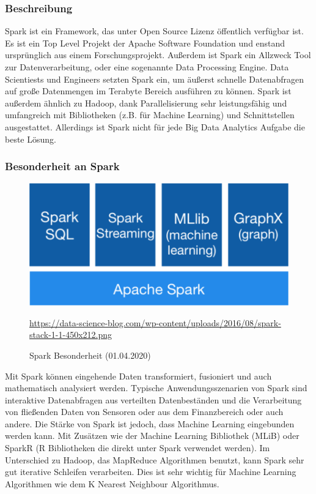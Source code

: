\subsubsection{Beschreibung}
Spark ist ein Framework, das unter Open Source Lizenz öffentlich verfügbar ist. Es ist ein Top Level Projekt der Apache Software Foundation und enstand ursprünglich aus einem Forschungsprojekt.
Außerdem ist Spark ein Allzweck Tool zur Datenverarbeitung, oder eine sogenannte Data Processing Engine. Data Scientiests und Engineers setzten Spark ein, um äußerst schnelle Datenabfragen auf große Datenmengen im Terabyte Bereich ausführen zu können.
Spark ist außerdem ähnlich zu Hadoop, dank Parallelisierung sehr leistungsfähig und umfangreich mit Bibliotheken (z.B. für Machine Learning) und Schnittstellen ausgestattet. Allerdings ist Spark nicht für jede Big Data Analytics Aufgabe die beste Lösung. 
\subsubsection{Besonderheit an Spark}
\begin{figure}[H]
\centering
  \includegraphics[scale=0.6]{images/spark.png}
  \caption[Spark Besonderheit (01.04.2020)]{Spark Besonderheit (01.04.2020)}
  \url{https://data-science-blog.com/wp-content/uploads/2016/08/spark-stack-1-1-450x212.png}
  \label{fig:Spark_Besonderheit} 
\end{figure}
Mit Spark können eingehende Daten transformiert, fusioniert und auch mathematisch analysiert werden. Typische Anwendungsszenarien von Spark sind interaktive Datenabfragen aus verteilten Datenbeständen und die Verarbeitung von fließenden Daten von Sensoren oder aus dem Finanzbereich oder auch andere. Die Stärke von Spark ist jedoch, dass Machine Learning eingebunden werden kann. Mit Zusätzen wie der Machine Learning Bibliothek (MLiB) oder SparkR (R Bibliotheken die direkt unter Spark verwendet werden). Im Unterschied zu Hadoop, das MapReduce Algorithmen benutzt, kann Spark sehr gut iterative Schleifen verarbeiten. Dies ist sehr wichtig für Machine Learning Algorithmen wie dem K Nearest Neighbour Algorithmus.\\

